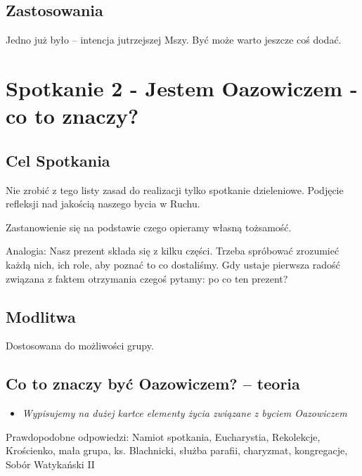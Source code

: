 \documentclass[a5paper,10pt,polish]{book}
\begin{document}
\section{Zastosowania}
\label{babice2006-jesien-gliwice/spotkanie1:zastosowania}
Jedno już było – intencja jutrzejszej Mszy. Być może warto jeszcze coś dodać.


\chapter{Spotkanie 2 - Jestem Oazowiczem - co to znaczy?}
\label{babice2006-jesien-gliwice/spotkanie2:spotkanie-2-jestem-oazowiczem-co-to-znaczy}\label{babice2006-jesien-gliwice/spotkanie2::doc}

\section{Cel Spotkania}
\label{babice2006-jesien-gliwice/spotkanie2:cel-spotkania}
Nie zrobić z tego listy zasad do realizacji tylko spotkanie dzieleniowe. Podjęcie refleksji nad jakością naszego bycia w Ruchu.

Zastanowienie się na podstawie czego opieramy własną tożsamość.

Analogia: Nasz prezent składa się z kilku części. Trzeba spróbować zrozumieć każdą nich, ich role, aby poznać to co dostaliśmy. Gdy ustaje pierwsza radość związana z faktem otrzymania czegoś pytamy: po co ten prezent?


\section{Modlitwa}
\label{babice2006-jesien-gliwice/spotkanie2:modlitwa}
Dostosowana do możliwości grupy.


\section{Co to znaczy być Oazowiczem? – teoria}
\label{babice2006-jesien-gliwice/spotkanie2:co-to-znaczy-byc-oazowiczem-teoria}\begin{itemize}
\item {} 
\emph{Wypisujemy na dużej kartce elementy życia związane z byciem Oazowiczem}

\end{itemize}

Prawdopodobne odpowiedzi: Namiot spotkania, Eucharystia, Rekolekcje, Krościenko, mała grupa, ks. Blachnicki, służba parafii, charyzmat, kongregacje, Sobór Watykański II
\end{document}
